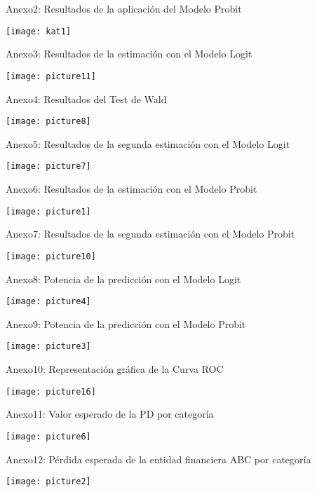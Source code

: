 \documentclass[11pt,fleqn]{book} %
\numberwithin{equation}{section} %
\numberwithin{figure}{section} %
\numberwithin{table}{section} %
\begin{document}
Anexo2: Resultados de la aplicación del Modelo Probit
\begin{center}
\texttt{[image: kat1]}
\end{center}

Anexo3: Resultados de la estimación con el Modelo Logit
\begin{center}
\texttt{[image: picture11]}
\end{center}

Anexo4: Resultados del Test de Wald
\begin{center}
\texttt{[image: picture8]}
\end{center}

Anexo5: Resultados de la segunda estimación con el Modelo Logit \begin{center}
\texttt{[image: picture7]}
\end{center}

\newpage
Anexo6: Resultados de la estimación con el Modelo Probit
\begin{center}
\texttt{[image: picture1]}
\end{center}

Anexo7: Resultados de la segunda estimación con el Modelo Probit
\begin{center}
\texttt{[image: picture10]}
\end{center}

Anexo8: Potencia de la predicción con el Modelo Logit
\begin{center}
\texttt{[image: picture4]}
\end{center}

\newpage
Anexo9: Potencia de la predicción con el Modelo Probit
\begin{center}
\texttt{[image: picture3]}
\end{center}

Anexo10: Representación gráfica de la Curva ROC
\begin{center}
\texttt{[image: picture16]}
\end{center}

Anexo11: Valor esperado de la PD por categoría
\begin{center}
\texttt{[image: picture6]}
\end{center}

Anexo12: Pérdida esperada de la entidad financiera ABC por categoría
\begin{center}
\texttt{[image: picture2]}
\end{center}
\end{document}
